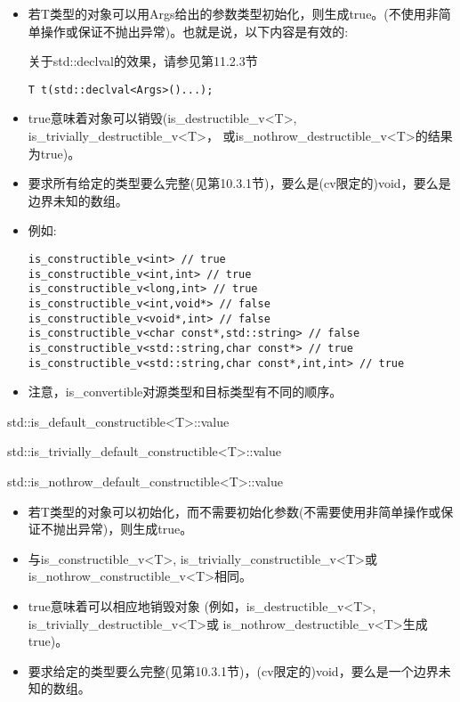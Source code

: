 \begin{itemize}
\item 
若T类型的对象可以用Args给出的参数类型初始化，则生成true。(不使用非简单操作或保证不抛出异常)。也就是说，以下内容是有效的:

\begin{tcolorbox}[colback=webgreen!5!white,colframe=webgreen!75!black]
\hspace*{0.75cm}关于std::declval的效果，请参见第11.2.3节
\end{tcolorbox}

\begin{lstlisting}[style=styleCXX]
T t(std::declval<Args>()...);
\end{lstlisting}

\item
true意味着对象可以销毁(is\_destructible\_v<T>, is\_trivially\_destructible\_v<T>， 或is\_nothrow\_destructible\_v<T>的结果为true)。

\item
要求所有给定的类型要么完整(见第10.3.1节)，要么是(cv限定的)void，要么是边界未知的数组。

\item
例如:
\begin{lstlisting}[style=styleCXX]
is_constructible_v<int> // true
is_constructible_v<int,int> // true
is_constructible_v<long,int> // true
is_constructible_v<int,void*> // false
is_constructible_v<void*,int> // false
is_constructible_v<char const*,std::string> // false
is_constructible_v<std::string,char const*> // true
is_constructible_v<std::string,char const*,int,int> // true
\end{lstlisting}

\item
注意，is\_convertible对源类型和目标类型有不同的顺序。
\end{itemize}

std::is\_default\_constructible<T>::value

std::is\_trivially\_default\_constructible<T>::value

std::is\_nothrow\_default\_constructible<T>::value

\begin{itemize}
\item 
若T类型的对象可以初始化，而不需要初始化参数(不需要使用非简单操作或保证不抛出异常)，则生成true。

\item 
与is\_constructible\_v<T>, is\_trivially\_constructible\_v<T>或 is\_nothrow\_constructible\_v<T>相同。

\item 
true意味着可以相应地销毁对象 (例如，is\_destructible\_v<T>, is\_trivially\_destructible\_v<T>或 is\_nothrow\_destructible\_v<T>生成true)。

\item 
要求给定的类型要么完整(见第10.3.1节)，(cv限定的)void，要么是一个边界未知的数组。
\end{itemize}

